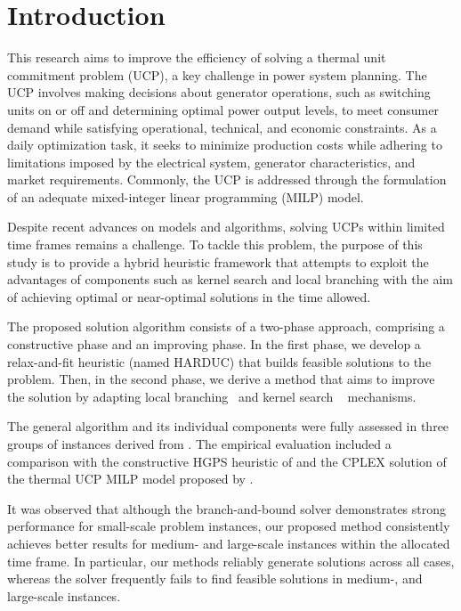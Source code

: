 \section{Introduction}
\label{sec:Introduction}

This research aims to improve the efficiency of solving a thermal unit commitment problem (UCP), a key challenge in power system planning. The UCP involves making decisions about generator operations, such as switching units on or off and determining optimal power output levels, to meet consumer demand while satisfying operational, technical, and economic constraints. As a daily optimization task, it seeks to minimize production costs while adhering to limitations imposed by the electrical system, generator characteristics, and market requirements. Commonly, the UCP is addressed through the formulation of an adequate mixed-integer linear programming (MILP) model.

Despite recent advances on models and algorithms, solving UCPs within limited time frames remains a challenge. To tackle this problem, the purpose of this study is to provide a hybrid heuristic framework that attempts to exploit the advantages of components such as kernel search and local branching with the aim of achieving optimal or near-optimal solutions in the time allowed.

The proposed solution algorithm consists of a two-phase approach, comprising a constructive phase and an improving phase. In the first phase, 
we develop a relax-and-fit heuristic (named HARDUC) that builds feasible solutions to the problem.
Then, in the second phase, we derive a method that aims to improve the solution by adapting local branching~\citep{Fischetti2003} and kernel search ~\citep{Angelelli2010} mechanisms.

The general algorithm and its individual components were fully assessed
in three groups of instances derived from \citet{Kazarlis1996}.
The empirical evaluation included a comparison with
the constructive HGPS heuristic of \citet{Harjunkoski2021} and the
CPLEX solution of the thermal UCP MILP model proposed by \citet{Knueven2020b}.

It was observed that
although the branch-and-bound solver demonstrates strong performance for small-scale problem instances, our proposed method consistently achieves better results for medium- and large-scale instances within the allocated time frame. In particular, our methods reliably generate solutions across all cases, whereas the solver frequently fails to find feasible solutions in medium-, and large-scale instances.

